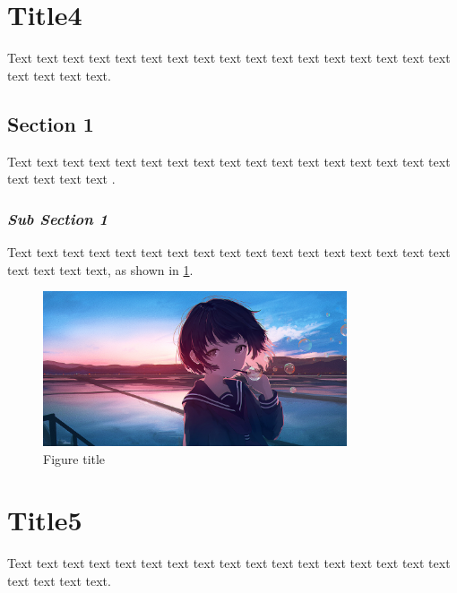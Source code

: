 \documentclass[12pt,a4paper]{article}
\numberwithin{equation}{section}
\begin{document}
{{\section{Title4}
\hspace{2em}Text text text text text text text text text text text text text text text text text text text text text.
\subsection{Section 1}
Text text text text text text text text text text text text text text text text text text text text text \cite{5}.
\subsubsection{\textit{Sub Section 1}}
\hspace{2em}Text text text text text text text text text text text text text text text text text text text text text, as shown in \cref{fig:4- 1}.
\begin{figure}[h]
    \centering
    \includegraphics[width=0.8\textwidth, height=0.8\textwidth]{Fig example.png}
    \caption{Figure title}
    \label{fig:4- 1}
\end{figure}

\section{Title5}
\hspace{2em}Text text text text text text text text text text text text text text text text text text text text text.
}}
\end{document}
